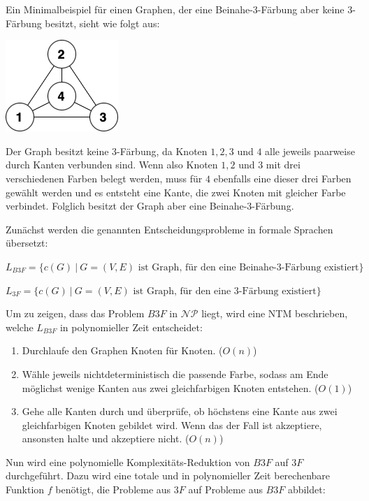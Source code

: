 \begin{teile}
 
	\item 
	Ein Minimalbeispiel für einen Graphen, der eine Beinahe-3-Färbung aber keine 3-Färbung besitzt, sieht wie folgt aus:

	\includegraphics[scale=0.6]{minimal_graph_beinahe-drei-faerbung}
	
	Der Graph besitzt keine 3-Färbung, da Knoten $1,2,3$ und $4$ alle jeweils paarweise durch Kanten verbunden sind. Wenn also Knoten $1,2$ und $3$ mit drei verschiedenen Farben belegt werden, muss für $4$ ebenfalls eine dieser drei Farben gewählt werden und es entsteht eine Kante, die zwei Knoten mit gleicher Farbe verbindet. Folglich besitzt der Graph aber eine Beinahe-3-Färbung.

	\item
	Zunächst werden die genannten Entscheidungsprobleme in formale Sprachen übersetzt:

	$L_{B3F} = \{c(G)\ |\ G=(V,E) \text{ ist Graph, für den eine Beinahe-3-Färbung existiert}\}$

	$L_{3F} = \{c(G)\ |\ G=(V,E) \text{ ist Graph, für den eine 3-Färbung existiert}\}$

	Um zu zeigen, dass das Problem $B3F$ in $\mathcal{NP}$ liegt, wird eine NTM beschrieben, welche $L_{B3F}$ in polynomieller Zeit entscheidet:
	\begin{enumerate}
		\item Durchlaufe den Graphen Knoten für Knoten. ($O(n)$)
		\item Wähle jeweils nichtdeterministisch die passende Farbe, sodass am Ende möglichst wenige Kanten aus zwei gleichfarbigen Knoten entstehen. ($O(1)$)
		\item Gehe alle Kanten durch und überprüfe, ob höchstens eine Kante aus zwei gleichfarbigen Knoten gebildet wird. Wenn das der Fall ist akzeptiere, ansonsten halte und akzeptiere nicht. ($O(n)$)
	\end{enumerate}

	Nun wird eine polynomielle Komplexitäts-Reduktion von $B3F$ auf $3F$ durchgeführt. Dazu wird eine totale und in polynomieller Zeit berechenbare Funktion $f$ benötigt, die Probleme aus $3F$ auf Probleme aus $B3F$ abbildet:


\end{teile}
